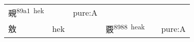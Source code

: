 \documentclass[14pt,a4paper]{scrartcl}
\begin{document}
\begin{longtable}[c]{@{}llllll@{}}
\begin{minipage}[t]{0.14\columnwidth}\raggedright\strut
覡\textsuperscript{89a1~hek}
\strut\end{minipage} &
\begin{minipage}[t]{0.14\columnwidth}\raggedright\strut
\strut\end{minipage} &
\begin{minipage}[t]{0.14\columnwidth}\raggedright\strut
pure:A
\strut\end{minipage}\tabularnewline
\begin{minipage}[t]{0.14\columnwidth}\raggedright\strut
敫
\strut\end{minipage} &
\begin{minipage}[t]{0.14\columnwidth}\raggedright\strut
hek
\strut\end{minipage} &
\begin{minipage}[t]{0.14\columnwidth}\raggedright\strut
\strut\end{minipage} &
\begin{minipage}[t]{0.14\columnwidth}\raggedright\strut
覈\textsuperscript{8988~heak}
\strut\end{minipage} &
\begin{minipage}[t]{0.14\columnwidth}\raggedright\strut
\strut\end{minipage} &
\begin{minipage}[t]{0.14\columnwidth}\raggedright\strut
pure:A
\strut\end{minipage}\tabularnewline
\bottomrule
\end{longtable}
\end{document}
